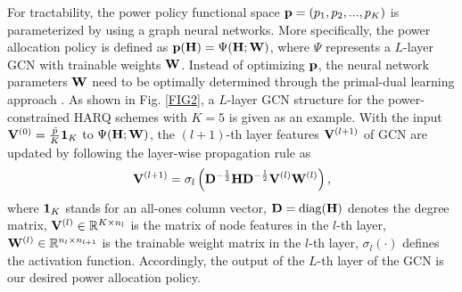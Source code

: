 \documentclass[conference]{IEEEtran}
\begin{document}


For tractability, the power policy functional space ${\bf p} = ( {{p_1},{p_2},...,{p_K}} )$ is parameterized by using a graph neural networks. More specifically, the power allocation policy is defined as ${\bf p}({\bf H}) = \Psi({\bf H};{\bf W})$, where $\Psi$ represents a $L$-layer GCN with trainable weights ${\bf W}$. Instead of optimizing ${\bf p}$, the neural network parameters ${\bf W}$ need to be optimally determined through the primal-dual learning approach \cite{9072356}. As shown in Fig. \ref{FIG2}, a $L$-layer GCN structure for the power-constrained HARQ schemes with $K=5$ is given as an example. With the input ${\bf V}^{(0)} = \frac{\bar p}{K} {\bf 1}_K$ to $\Psi({\bf H};{\bf W})$, %
the $(l+1)$-th layer features  ${\bf V}^{(l + 1)}$ of GCN are updated by following the layer-wise propagation rule as
\begin{equation}\label{eqn:GNNfunc}
{{\bf{V}}^{(l + 1)}} = \sigma_l\left({{\bf{D}}^{ - \frac{1}{2}}}{\bf{H}}{{\bf{D}}^{ - \frac{1}{2}}}{{\bf{V}}^{(l)}}{{\bf{W}}^{(l)}}\right),
\end{equation}
where ${\bf 1}_K$ stands for an all-ones column vector, ${{\bf{D}}} = {\rm diag}({\bf{H}})$ denotes the degree matrix, ${{\bf{V}}^{(l)}} \in {\mathbb R^{K\times n_{l}}}$ is the matrix of node features in the $l$-th layer, ${{\bf W}^{(l)}} \in \mathbb R^{n_l\times n_{l+1}}$ is the trainable weight matrix in the $l$-th layer, $\sigma _l( \cdot )$ defines the activation function. Accordingly, the output of the $L$-th layer of the GCN is our desired power allocation policy. %
\end{document}
